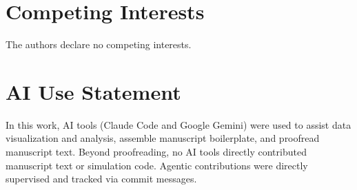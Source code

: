 \begingroup
\footnotesize



\section*{Competing Interests}

The authors declare no competing interests.






\section*{AI Use Statement}

In this work, AI tools (Claude Code and Google Gemini) were used to assist data visualization and analysis, assemble manuscript boilerplate, and proofread manuscript text.
Beyond proofreading, no AI tools directly contributed manuscript text or simulation code.
Agentic contributions were directly supervised and tracked via commit messages.

